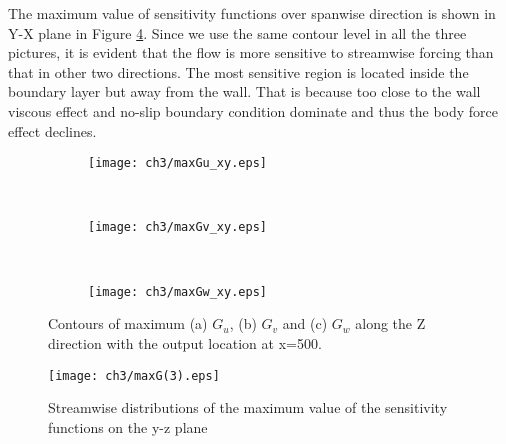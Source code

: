 The maximum value of sensitivity functions over spanwise direction is shown in Y-X plane in Figure \ref{f:Guvw_xy}. Since we use the same contour level in all the three pictures, it is evident that the flow is more sensitive to streamwise forcing than that in other two directions. The most sensitive region is located inside the boundary layer but away from the wall. That is because too close to the wall viscous effect and no-slip boundary condition dominate and thus the body force effect declines.
\begin{figure}
  \centering
  \begin{subfigure}{\textwidth}
  \texttt{[image: ch3/maxGu\_xy.eps]}
  \caption{\label{f:Gu_xy}}
  \end{subfigure}\\
  \bigskip
  \begin{subfigure}{\textwidth}
  \texttt{[image: ch3/maxGv\_xy.eps]}
  \caption{\label{f:Gv_xy}}
  \end{subfigure}\\
  \bigskip
  \begin{subfigure}{\textwidth}
  \texttt{[image: ch3/maxGw\_xy.eps]}
  \caption{\label{f:Gw_xy}}
  \end{subfigure}
  \caption{Contours of maximum (a) $G_u$, (b) $G_v$ and (c) $G_w$ along the Z direction with the output location at x=500.}\label{f:Guvw_xy}
\end{figure}

\begin{figure}
  \centering
  \texttt{[image: ch3/maxG(3).eps]}\\
  \caption{Streamwise distributions of the maximum value of the sensitivity functions on the y-z plane}\label{f:maxsen}
\end{figure}

